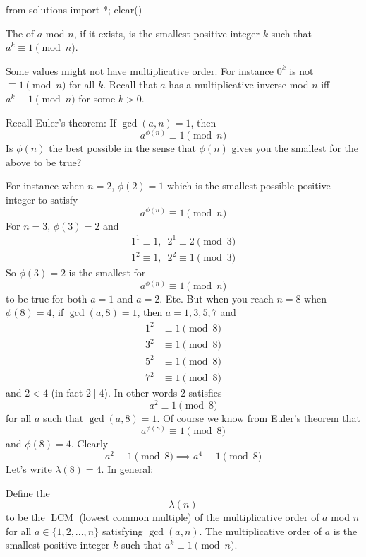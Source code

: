 \begin{python0}
from solutions import *; clear()
\end{python0}

\begin{defn}
  The  of $a$ mod $n$, if it exists,
  is the smallest positive integer $k$
  such that $a^k \equiv 1 \pmod{n}$.
\end{defn}

Some values might not have multiplicative order.
For instance $0^k$ is not $\equiv 1 \pmod{n}$ for all $k$.
Recall that 
$a$ has a multiplicative inverse mod $n$
iff $a^k \equiv 1 \pmod{n}$ for some $k > 0$.

Recall Euler's theorem: If $\gcd(a, n) = 1$, then
\[
a^{\phi(n)} \equiv 1 \pmod{n}
\]
Is $\phi(n)$ the best possible in the sense that $\phi(n)$ gives you
the smallest for the above to be true?

For instance when $n = 2$, $\phi(2) = 1$ which is the smallest
possible positive integer to satisfy
\[
a^{\phi(n)} \equiv 1 \pmod{n}
\]
For $n = 3$, $\phi(3) = 2$ and
\begin{align*}
  1^1 \equiv 1, \,\,\, 2^1 \equiv 2 \pmod{3} \\
  1^2 \equiv 1, \,\,\, 2^2 \equiv 1 \pmod{3}
\end{align*}
So $\phi(3) = 2$ is the smallest for
\[
a^{\phi(n)} \equiv 1 \pmod{n}
\]
to be true for both $a = 1$ and $a = 2$.
Etc.
But when you reach $n = 8$ when $\phi(8) = 4$,
if $\gcd(a, 8) = 1$, then $a = 1, 3, 5, 7$ and
\begin{align*}
  1^2 &\equiv 1 \pmod{8} \\
  3^2 &\equiv 1 \pmod{8} \\
  5^2 &\equiv 1 \pmod{8} \\
  7^2 &\equiv 1 \pmod{8}
\end{align*}
and $2 < 4$ (in fact $2 \mid 4$).
In other words $2$ satisfies
\[
a^2 \equiv 1 \pmod{8}
\]
for all $a$ such that $\gcd(a, 8) = 1$.
Of course we know from Euler's theorem that
\[
a^{\phi{(8)}} \equiv 1 \pmod{8}
\]
and $\phi(8) = 4$.
Clearly 
\[
a^2 \equiv 1 \pmod{8}
\implies
a^4 \equiv 1 \pmod{8}
\]
Let's write $\lambda(8) = 4$.
In general:

\begin{defn}
  Define the
  \[
  \lambda(n)
  \]
  to be the $\operatorname{LCM}$ (lowest common multiple)
  of the multiplicative order of $a$ mod $n$
  for all $a \in \{1, 2, ..., n\}$
  satisfying $\gcd(a, n)$.
  The multiplicative order of $a$ is the smallest positive integer $k$
  such that $a^k \equiv 1 \pmod{n}$.
\end{defn}

